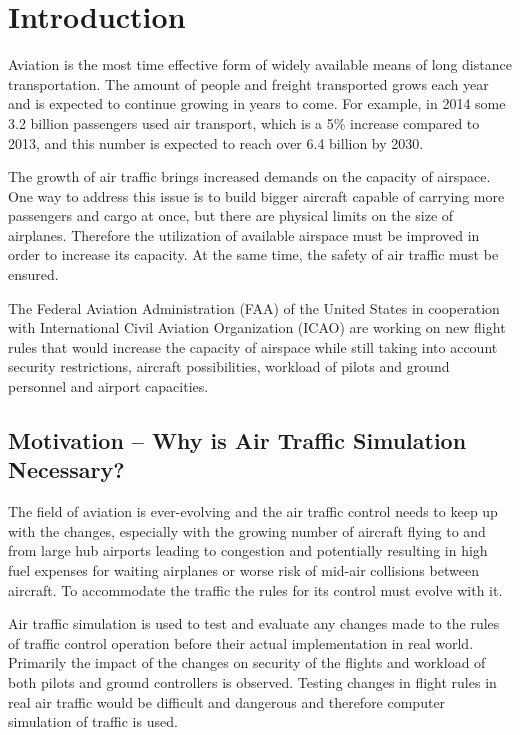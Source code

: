 \chapter{Introduction}

Aviation is the most time effective form of widely available means of long distance transportation. The amount of people and freight transported grows each year and is expected to continue growing in years to come. For example, in 2014 some 3.2 billion passengers used air transport, which is a 5\% increase compared to 2013, and this number is expected to reach over 6.4 billion by 2030. \cite{growth}

The growth of air traffic brings increased demands on the capacity of airspace. One way to address this issue is to build bigger aircraft capable of carrying more passengers and cargo at once, but there are physical limits on the size of airplanes. Therefore the utilization of available airspace must be improved in order to increase its capacity. At the same time, the safety of air traffic must be ensured.

The Federal Aviation Administration (FAA) of the United States in cooperation with International Civil Aviation Organization (ICAO) are working on new flight rules that would increase the capacity of airspace while still taking into account security restrictions, aircraft possibilities, workload of pilots and ground personnel and airport capacities.

\section{Motivation – Why is Air Traffic Simulation Necessary?}

The field of aviation is ever-evolving and the air traffic control needs to keep up with the changes, especially with the growing number of aircraft flying to and from large hub airports leading to congestion and potentially resulting in high fuel expenses for waiting airplanes or worse risk of mid-air collisions between aircraft. To accommodate the traffic the rules for its control must evolve with it.

Air traffic simulation is used to test and evaluate any changes made to the rules of traffic control operation before their actual implementation in real world. Primarily the impact of the changes on security of the flights and workload of both pilots and ground controllers is observed. Testing changes in flight rules in real air traffic would be difficult and dangerous and therefore computer simulation of traffic is used.

